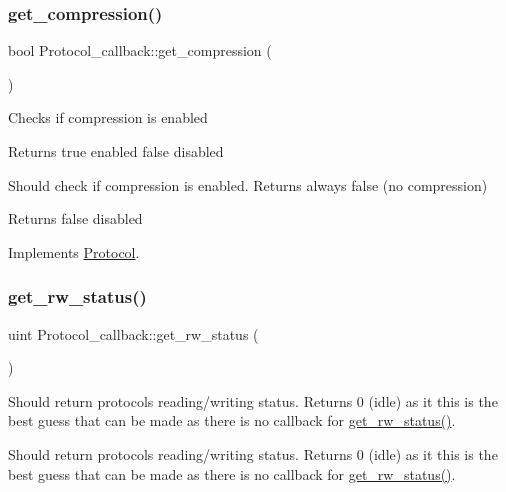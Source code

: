 \subsubsection{\texorpdfstring{get\+\_\+compression()}{get\_compression()}}
{\footnotesize\ttfamily bool Protocol\+\_\+callback\+::get\+\_\+compression (\begin{DoxyParamCaption}{ }\end{DoxyParamCaption})\hspace{0.3cm}{\ttfamily [virtual]}}

Checks if compression is enabled

\begin{DoxyReturn}{Returns}
true enabled false disabled
\end{DoxyReturn}
Should check if compression is enabled. Returns always false (no compression)

\begin{DoxyReturn}{Returns}
false disabled 
\end{DoxyReturn}


Implements \mbox{\hyperlink{classProtocol_a7b500a3f2e52a98903d853b8f365ac7d}{Protocol}}.

\mbox{\label{classProtocol__callback_a2cc42f90003a4a72504b5fc2ae945f03}} 
\subsubsection{\texorpdfstring{get\+\_\+rw\+\_\+status()}{get\_rw\_status()}}
{\footnotesize\ttfamily uint Protocol\+\_\+callback\+::get\+\_\+rw\+\_\+status (\begin{DoxyParamCaption}{ }\end{DoxyParamCaption})\hspace{0.3cm}{\ttfamily [virtual]}}

Should return protocol\textquotesingle{}s reading/writing status. Returns 0 (idle) as it this is the best guess that can be made as there is no callback for \mbox{\hyperlink{classProtocol__callback_a2cc42f90003a4a72504b5fc2ae945f03}{get\+\_\+rw\+\_\+status()}}.

Should return protocol\textquotesingle{}s reading/writing status. Returns 0 (idle) as it this is the best guess that can be made as there is no callback for \mbox{\hyperlink{classProtocol__callback_a2cc42f90003a4a72504b5fc2ae945f03}{get\+\_\+rw\+\_\+status()}}.

